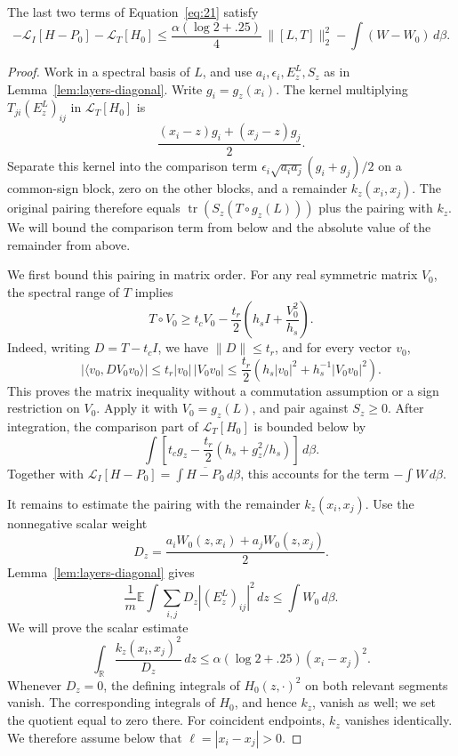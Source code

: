 \begin{lemma}\label{lem:layers-variable}
The last two terms of Equation~\eqref{eq:21} satisfy
\begin{equation}
 -\mathcal L_I[H-P_0]-\mathcal L_T[H_0]
 \le\frac{\alpha(\log2+.25)}4\,\|[L,T]\|_2^2
       -\int(W-W_0)\,d\beta.
 \tag{22}\label{eq:22}
\end{equation}
\end{lemma}

\begin{proof}
Work in a spectral basis of \(L\), and use
\(a_i,\epsilon_i,E_z^L,S_z\) as in
Lemma~\ref{lem:layers-diagonal}.
Write \(g_i=g_z(x_i)\).
The kernel multiplying \(T_{ji}(E_z^L)_{ij}\) in
\(\mathcal L_T[H_0]\) is
\[
 \frac{(x_i-z)g_i+(x_j-z)g_j}{2}.
\]
Separate this kernel into the comparison term
\(\epsilon_i\sqrt{a_i a_j}(g_i+g_j)/2\) on a common-sign block,
zero on the other blocks, and a remainder \(k_z(x_i,x_j)\).
The original pairing therefore equals
\(\operatorname{tr}(S_z(T\circ g_z(L)))\) plus the pairing with
\(k_z\). We will bound the comparison term from below and the
absolute value of the remainder from above.

We first bound this pairing in matrix order.
For any real symmetric matrix \(V_0\), the spectral range of \(T\)
implies
\[
 T\circ V_0\ge
 t_cV_0-\frac{t_r}{2}\left(h_sI+\frac{V_0^2}{h_s}\right).
\]
Indeed, writing \(D=T-t_cI\), we have \(\|D\|\le t_r\), and for
every vector \(v_0\),
\[
 |\langle v_0,DV_0v_0\rangle|
 \le t_r|v_0|\,|V_0v_0|
 \le\frac{t_r}{2}
       \left(h_s|v_0|^2+h_s^{-1}|V_0v_0|^2\right).
\]
This proves the matrix inequality without a commutation
assumption or a sign restriction on \(V_0\).
Apply it with \(V_0=g_z(L)\), and pair against \(S_z\ge0\).
After integration, the comparison part of
\(\mathcal L_T[H_0]\) is bounded below by
\[
 \int\left[t_cg_z-\frac{t_r}{2}
                    (h_s+g_z^2/h_s)\right]\,d\beta.
\]
Together with
\(\mathcal L_I[H-P_0]=\int\overline{H-P_0}\,d\beta\),
this accounts for the term \(-\int W\,d\beta\).

It remains to estimate the pairing with the remainder \(k_z(x_i,x_j)\).
Use the nonnegative scalar weight
\[
 D_z=\frac{a_iW_0(z,x_i)+a_jW_0(z,x_j)}2.
\]
Lemma~\ref{lem:layers-diagonal} gives
\[
 \frac1m\mathbb E\int\sum_{i,j}
          D_z|(E_z^L)_{ij}|^2\,dz
 \le\int W_0\,d\beta.
\]
We will prove the scalar estimate
\[
 \int_{\mathbb R}\frac{k_z(x_i,x_j)^2}{D_z}\,dz
 \le\alpha(\log2+.25)(x_i-x_j)^2.
\]
Whenever \(D_z=0\), the defining integrals of \(H_0(z,\cdot)^2\)
on both relevant segments vanish.  The corresponding integrals
of \(H_0\), and hence \(k_z\), vanish as well; we set the quotient
equal to zero there.
For coincident endpoints, \(k_z\) vanishes identically.
We therefore assume below that \(\ell=|x_i-x_j|>0\).


\end{proof}
